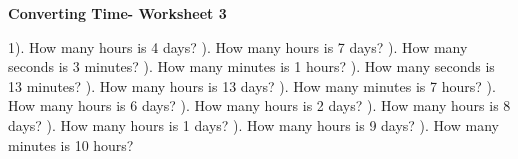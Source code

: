 \documentclass{article}%
\begin{document}
\newline%
\pagebreak%
\large%
\begin{center}%
\textbf{Converting Time- Worksheet 3}%
\newline%
\end{center} \normalsize%
1). How many hours is 4 days?%
\newline%
\newline%
). How many hours is 7 days?%
\newline%
\newline%
). How many seconds is 3 minutes?%
\newline%
\newline%
). How many minutes is 1 hours?%
\newline%
\newline%
). How many seconds is 13 minutes?%
\newline%
\newline%
). How many hours is 13 days?%
\newline%
\newline%
). How many minutes is 7 hours?%
\newline%
\newline%
). How many hours is 6 days?%
\newline%
\newline%
). How many hours is 2 days?%
\newline%
\newline%
). How many hours is 8 days?%
\newline%
\newline%
). How many hours is 1 days?%
\newline%
\newline%
). How many hours is 9 days?%
\newline%
\newline%
). How many minutes is 10 hours?%
\newline%
\newline%
\end{document}
